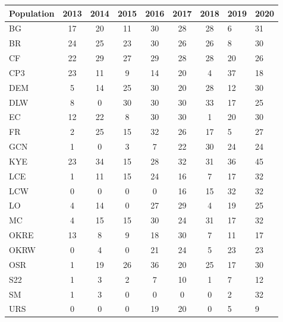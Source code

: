 \documentclass[varwidth=\maxdimen,border=1pt]{standalone}
\begin{document}
 
\begin{tabular}{lcccccc}
  \hline
  \hline
Population & 2013 & 2014 & 2015 & 2016 & 2017 & 2018 & 2019 & 2020 \\ 
  \hline
BG &  17 &  20 &  11 &  30 &  28 &  28 &   6 &  31 \\ 
  BR &  24 &  25 &  23 &  30 &  26 &  26 &   8 &  30 \\ 
  CF &  22 &  29 &  27 &  29 &  28 &  28 &  20 &  26 \\ 
  CP3 &  23 &  11 &   9 &  14 &  20 &   4 &  37 &  18 \\ 
  DEM &   5 &  14 &  25 &  30 &  20 &  28 &  12 &  30 \\ 
  DLW &   8 &   0 &  30 &  30 &  30 &  33 &  17 &  25 \\ 
  EC &  12 &  22 &   8 &  30 &  30 &   1 &  20 &  30 \\ 
  FR &   2 &  25 &  15 &  32 &  26 &  17 &   5 &  27 \\ 
  GCN &   1 &   0 &   3 &   7 &  22 &  30 &  24 &  24 \\ 
  KYE &  23 &  34 &  15 &  28 &  32 &  31 &  36 &  45 \\ 
  LCE &   1 &  11 &  15 &  24 &  16 &   7 &  17 &  32 \\ 
  LCW &   0 &   0 &   0 &   0 &  16 &  15 &  32 &  32 \\ 
  LO &   4 &  14 &   0 &  27 &  29 &   4 &  19 &  25 \\ 
  MC &   4 &  15 &  15 &  30 &  24 &  31 &  17 &  32 \\ 
  OKRE &  13 &   8 &   9 &  18 &  30 &   7 &  11 &  17 \\ 
  OKRW &   0 &   4 &   0 &  21 &  24 &   5 &  23 &  23 \\ 
  OSR &   1 &  19 &  26 &  36 &  20 &  25 &  17 &  30 \\ 
  S22 &   1 &   3 &   2 &   7 &  10 &   1 &   7 &  12 \\ 
  SM &   1 &   3 &   0 &   0 &   0 &   0 &   2 &  32 \\ 
  URS &   0 &   0 &   0 &  19 &  20 &   0 &   5 &   9 \\ 
   \hline
\end{tabular}

 
\end{document}
